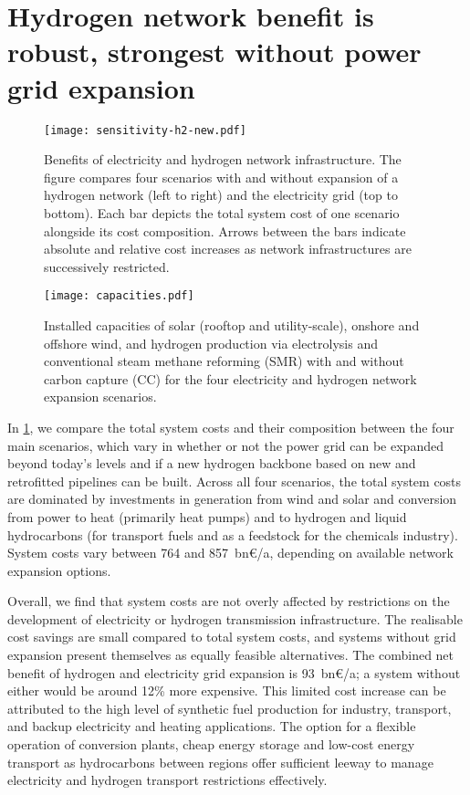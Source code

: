 \section*{Hydrogen network benefit is robust, strongest without power grid expansion}
\label{sec:h2}


\begin{figure}
    \centering
    \texttt{[image: sensitivity-h2-new.pdf]}
    \caption{Benefits of electricity and hydrogen network infrastructure. The
    figure compares four scenarios with and without expansion of a hydrogen
    network (left to right) and the electricity grid (top to bottom). Each bar
    depicts the total system cost of one scenario alongside its cost
    composition. Arrows between the bars indicate absolute and relative cost
    increases as network infrastructures are successively restricted.}
    \label{fig:sensitivity-h2}
\end{figure}

\begin{figure}
    \centering
    \texttt{[image: capacities.pdf]}
    \caption{Installed capacities of solar (rooftop and utility-scale), onshore
    and offshore wind, and hydrogen production via electrolysis and conventional steam
    methane reforming (SMR) with and without carbon capture (CC) for the four
    electricity and hydrogen network expansion scenarios.}
    \label{fig:capacities}
\end{figure}

In \cref{fig:sensitivity-h2}, we compare the total system costs and their
composition between the four main scenarios, which vary in whether or not the
power grid can be expanded beyond today's levels and if a new hydrogen backbone
based on new and retrofitted pipelines can be built. Across all four scenarios,
the total system costs are dominated by investments in generation from wind and
solar and conversion from power to heat (primarily heat pumps) and to hydrogen
and liquid hydrocarbons (for transport fuels and as a feedstock for the
chemicals industry). System costs vary between 764 and 857~bn\euro/a, depending
on available network expansion options.

Overall, we find that system costs are not overly affected by restrictions on
the development of electricity or hydrogen transmission infrastructure. The
realisable cost savings are small compared to total system costs, and systems
without grid expansion present themselves as equally feasible alternatives. The
combined net benefit of hydrogen and electricity grid expansion is 93~bn\euro/a;
a system without either would be around 12\% more expensive. This limited cost
increase can be attributed to the high level of synthetic fuel production for
industry, transport, and backup electricity and heating applications. The option
for a flexible operation of conversion plants, cheap energy storage and low-cost
energy transport as hydrocarbons between regions offer sufficient leeway to
manage electricity and hydrogen transport restrictions effectively.


